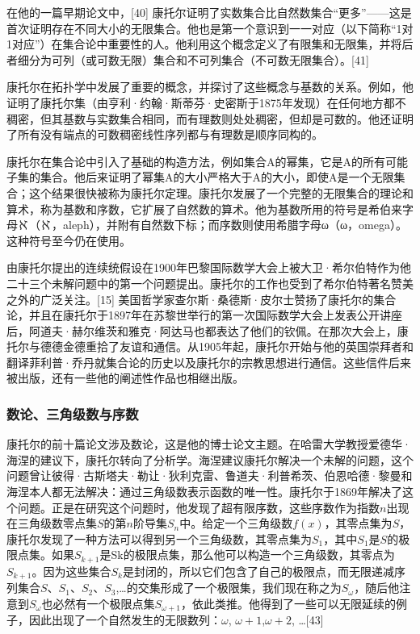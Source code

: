 在他的一篇早期论文中，[40] 康托尔证明了实数集合比自然数集合“更多”——这是首次证明存在不同大小的无限集合。他也是第一个意识到一一对应（以下简称“1对1对应”）在集合论中重要性的人。他利用这个概念定义了有限集和无限集，并将后者细分为可列（或可数无限）集合和不可列集合（不可数无限集合）。[41]

康托尔在拓扑学中发展了重要的概念，并探讨了这些概念与基数的关系。例如，他证明了康托尔集（由亨利·约翰·斯蒂芬·史密斯于1875年发现）在任何地方都不稠密，但其基数与实数集合相同，而有理数则处处稠密，但却是可数的。他还证明了所有没有端点的可数稠密线性序列都与有理数是顺序同构的。

康托尔在集合论中引入了基础的构造方法，例如集合A的幂集，它是A的所有可能子集的集合。他后来证明了幂集A的大小严格大于A的大小，即使A是一个无限集合；这个结果很快被称为康托尔定理。康托尔发展了一个完整的无限集合的理论和算术，称为基数和序数，它扩展了自然数的算术。他为基数所用的符号是希伯来字母ℵ（ℵ，aleph），并附有自然数下标；而序数则使用希腊字母ω（ω，omega）。这种符号至今仍在使用。

由康托尔提出的连续统假设在1900年巴黎国际数学大会上被大卫·希尔伯特作为他二十三个未解问题中的第一个问题提出。康托尔的工作也受到了希尔伯特著名赞美之外的广泛关注。[15] 美国哲学家查尔斯·桑德斯·皮尔士赞扬了康托尔的集合论，并且在康托尔于1897年在苏黎世举行的第一次国际数学大会上发表公开讲座后，阿道夫·赫尔维茨和雅克·阿达马也都表达了他们的钦佩。在那次大会上，康托尔与德德金德重拾了友谊和通信。从1905年起，康托尔开始与他的英国崇拜者和翻译菲利普·乔丹就集合论的历史以及康托尔的宗教思想进行通信。这些信件后来被出版，还有一些他的阐述性作品也相继出版。
\subsubsection{数论、三角级数与序数}  
康托尔的前十篇论文涉及数论，这是他的博士论文主题。在哈雷大学教授爱德华·海涅的建议下，康托尔转向了分析学。海涅建议康托尔解决一个未解的问题，这个问题曾让彼得·古斯塔夫·勒让·狄利克雷、鲁道夫·利普希茨、伯恩哈德·黎曼和海涅本人都无法解决：通过三角级数表示函数的唯一性。康托尔于1869年解决了这个问题。正是在研究这个问题时，他发现了超有限序数，这些序数作为指数\(n\)出现在三角级数零点集\(S\)的第\(n\)阶导集\(S_n\)中。给定一个三角级数\(f(x)\)，其零点集为\(S\)，康托尔发现了一种方法可以得到另一个三角级数，其零点集为\(S_1\)，其中\(S_1\)是\(S\)的极限点集。如果\(S_{k+1}\)是Sk的极限点集，那么他可以构造一个三角级数，其零点为\(S_{k+1}\)。因为这些集合\(S_k\)是封闭的，所以它们包含了自己的极限点，而无限递减序列集合\(S\)、\(S_1\)、\(S_2\)、\(S_3\),…的交集形成了一个极限集，我们现在称之为\(S_\omega\)，随后他注意到\(S_\omega\)也必然有一个极限点集\(S_{\omega+1}\)，依此类推。他得到了一些可以无限延续的例子，因此出现了一个自然发生的无限数列：\(\omega\), \(\omega+1\),\(\omega+2\), …[43]

